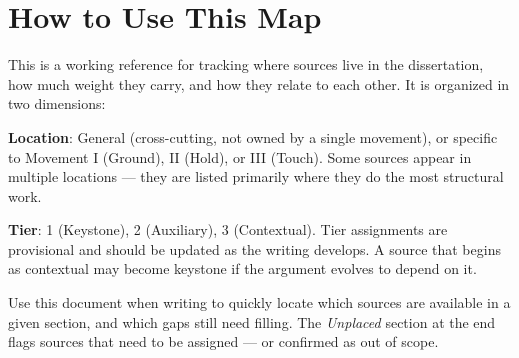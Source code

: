 %
%
%


\section*{How to Use This Map}

This is a working reference for tracking where sources live in the dissertation, how much weight they carry, and how they relate to each other. It is organized in two dimensions:

\textbf{Location}: General (cross-cutting, not owned by a single movement), or specific to Movement I (Ground), II (Hold), or III (Touch). Some sources appear in multiple locations — they are listed primarily where they do the most structural work.

\textbf{Tier}: 1 (Keystone), 2 (Auxiliary), 3 (Contextual). Tier assignments are provisional and should be updated as the writing develops. A source that begins as contextual may become keystone if the argument evolves to depend on it.

Use this document when writing to quickly locate which sources are available in a given section, and which gaps still need filling. The \textit{Unplaced} section at the end flags sources that need to be assigned — or confirmed as out of scope.

